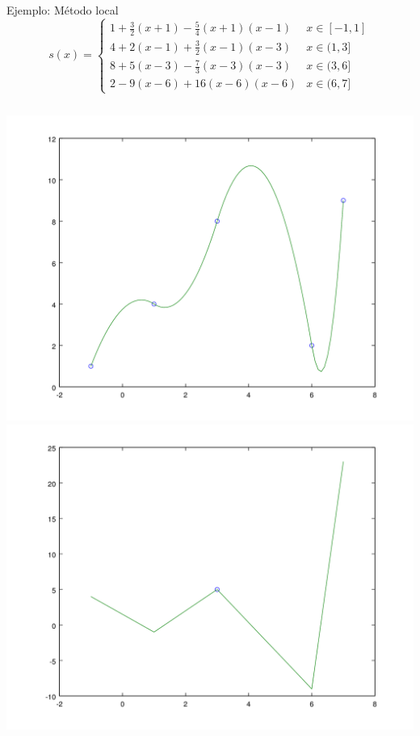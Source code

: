 \documentclass[compress]{beamer}
\theoremstyle{definition}
\theoremstyle{remark}
\begin{document}
\begin{frame}{Ejemplo: Método local}
\begin{equation*}
s(x)=
\begin{cases}
1+\frac{3}{2}(x+1)-\frac{5}{4}(x+1)(x-1) & x\in [-1,1]\\
4+2(x-1)+\frac{3}{2}(x-1)(x-3) & x\in (1,3]\\
8+5(x-3)- \frac{7}{3} (x-3)(x-3) & x\in (3,6]\\
2 -9(x-6)+16(x-6)(x-6) & x\in (6,7]
\end{cases}
\end{equation*}

\vfill

\begin{columns}
\includegraphics[width=\textwidth]{EjemploLocal.png}
\includegraphics[width=\textwidth]{EjemploLocalDer.png}
\end{columns}
\end{frame}
\end{document}
